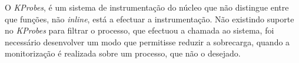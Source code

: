 




O \textit{KProbes}, é um sistema de instrumentação do núcleo que não distingue entre que funções, não \textit{inline}, está a efectuar a instrumentação.
Não existindo suporte no \textit{KProbes} para filtrar o processo, que efectuou a chamada ao sistema, foi necessário desenvolver um modo que permitisse reduzir a sobrecarga, quando a monitorização é realizada sobre um processo, que não o desejado.




